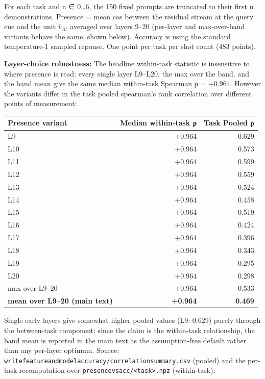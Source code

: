 \documentclass{article}
\renewcommand{\_}{\textunderscore\allowbreak}
\begin{document}
For each task and n ∈ 0\ldots6, the 150 fixed prompts are truncated to their first n demonstrations. Presence = mean cos between the residual stream at the query cue and the unit \(\hat v_A\), averaged over layers 9--20 (per-layer and max-over-band variants behave the same, shown below). Accuracy is using the standard temperature-1 sampled reponse. One point per task per shot count (483 points).

\textbf{Layer-choice robustness:} The headline within-task statistic is insensitive to where presence is read: every single layer L9--L20, the max over the band, and the band mean give the same median within-task Spearman ρ = +0.964. However the variants differ in the task pooled spearman's rank correlation over different points of measurement:

{\def\LTcaptype{none} %
\begin{longtable}[]{@{}lrr@{}}
\toprule\noalign{}
Presence variant & Median within-task ρ & Task Pooled ρ \\
\midrule\noalign{}
\endhead
\bottomrule\noalign{}
\endlastfoot
L9 & +0.964 & 0.629 \\
L10 & +0.964 & 0.573 \\
L11 & +0.964 & 0.599 \\
L12 & +0.964 & 0.559 \\
L13 & +0.964 & 0.524 \\
L14 & +0.964 & 0.458 \\
L15 & +0.964 & 0.519 \\
L16 & +0.964 & 0.424 \\
L17 & +0.964 & 0.396 \\
L18 & +0.964 & 0.343 \\
L19 & +0.964 & 0.295 \\
L20 & +0.964 & 0.298 \\
max over L9--20 & +0.964 & 0.533 \\
\textbf{mean over L9--20 (main text)} & \textbf{+0.964} & \textbf{0.469} \\
\end{longtable}
}

Single early layers give somewhat higher pooled values (L9: 0.629) purely through the between-task component; since the claim is the within-task relationship, the band mean is reported in the main text as the assumption-free default rather than any per-layer optimum. Source: \texttt{write\_feature\_and\_model\_accuracy/correlation\_summary.csv} (pooled) and the per-task recomputation over \texttt{presence\_vs\_acc/\textless{}task\textgreater{}.npz} (within-task).
\end{document}
